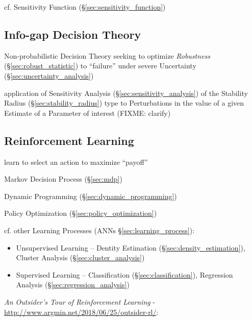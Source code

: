 cf. Sensitivity Function (\S\ref{sec:sensitivity_function})



\subsection{Info-gap Decision Theory}\label{sec:info_gap}

Non-probabilistic Decision Theory seeking to optimize \emph{Robustness}
(\S\ref{sec:robust_statistic}) to ``failure'' under severe Uncertainty
(\S\ref{sec:uncertainty_analysis})

application of Sensitivity Analysis (\S\ref{sec:sensitivity_analysis}) of the
Stability Radius (\S\ref{sec:stability_radius}) type to Perturbations in the
value of a given Estimate of a Parameter of interest (FIXME: clarify)



\subsection{Reinforcement Learning}\label{sec:reinforcement_learning}

learn to select an action to maximize ``payoff''

Markov Decision Process (\S\ref{sec:mdp})

Dynamic Programming (\S\ref{sec:dynamic_programming})

Policy Optimization (\S\ref{sec:policy_optimization})

cf. other Learning Processes (ANNs \S\ref{sec:learning_process}):
\begin{itemize}
  \item Unsupervised Learning -- Dentity Estimation
    (\S\ref{sec:density_estimation}), Cluster Analysis
    (\S\ref{sec:cluster_analysis})
  \item Supervised Learning -- Classification (\S\ref{sec:classification}),
    Regression Analysis (\S\ref{sec:regression_analysis})
\end{itemize}

\emph{An Outsider's Tour of Reinforcement Learning} -
\url{http://www.argmin.net/2018/06/25/outsider-rl/}:

